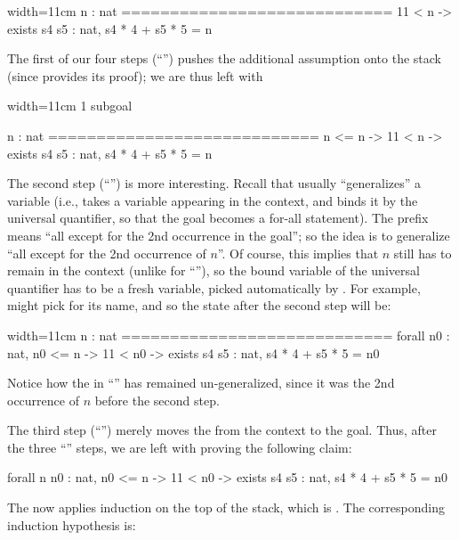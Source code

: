 \begin{coqout}{}{width=11cm}
  n : nat
  ============================
  11 < n -> exists s4 s5 : nat, s4 * 4 + s5 * 5 = n
\end{coqout}

The first of our
four steps (``'') pushes the additional
assumption  onto the stack (since  provides
its proof); we are thus left with

\begin{coqout}{}{width=11cm}
1 subgoal

  n : nat
  ============================
  n <= n -> 11 < n -> exists s4 s5 : nat, s4 * 4 + s5 * 5 = n
\end{coqout}

The second step (``'') is more interesting. Recall
that  usually ``generalizes'' a variable (i.e., takes a
variable appearing in the context, and binds it by the universal
quantifier, so that the goal becomes a for-all statement). The prefix
 means ``all except for the 2nd occurrence in the goal''; so
the idea is
to generalize ``all except for the 2nd occurrence of $n$''. Of course,
this implies that $n$ still has to remain in the context (unlike for
``''), so the
bound variable of the universal quantifier has to be a fresh
variable, picked automatically by \Coq{}. For example, \Coq{} might
pick  for its name, and so the state after the second step will
be:

\begin{coqout}{}{width=11cm}
  n : nat
  ============================
  forall n0 : nat,
  n0 <= n -> 11 < n0 -> exists s4 s5 : nat, s4 * 4 + s5 * 5 = n0
\end{coqout}

Notice how the  in ``'' has remained un-generalized,
since it was the 2nd occurrence of $n$ before the second step.

The third step (``'') merely moves the  from the
context to the goal. Thus, after the three ``'' steps, we are
left with proving the following claim:

\begin{coq}{}{}
forall n n0 : nat,
  n0 <= n -> 11 < n0 -> exists s4 s5 : nat, s4 * 4 + s5 * 5 = n0
\end{coq}

The  now applies induction on the top of the stack, which
is . The corresponding induction hypothesis  is:

